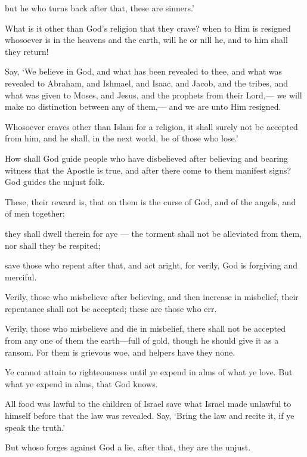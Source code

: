\documentclass[fontsize=14pt, letterpaper, notitlepage, openany, DIV=12]{scrbook} %
\begin{document}
\noindent[3:82]
but he who turns back after that, these are sinners.'

\noindent[3:83]
What is it other than God's religion that they crave? when to Him is resigned whosoever
is in the heavens and the earth, will he or nill he, and to him shall they return!

\noindent[3:84]
Say, `We believe in God, and what has been revealed to thee, and what was revealed to
Abraham, and Ishmael, and Isaac, and Jacob, and the tribes, and what was given to Moses, and
Jesus, and the prophets from their Lord,--- we will make no distinction between any of them,---
and we are unto Him resigned.

\noindent[3:85]
Whosoever craves other than Islam for a religion, it shall surely not be accepted from
him, and he shall, in the next world, be of those who lose.'

\noindent[3:86]
How shall God guide people who have disbelieved after believing and bearing witness
that the Apostle is true, and after there come to them manifest signs? God guides the unjust folk.

\noindent[3:87]
These, their reward is, that on them is the curse of God, and of the angels, and of men
together;

\noindent[3:88]
they shall dwell therein for aye --- the torment shall not be alleviated from them, nor shall
they be respited;

\noindent[3:89]
save those who repent after that, and act aright, for verily, God is forgiving and merciful.

\noindent[3:90]
Verily, those who misbelieve after believing, and then increase in misbelief, their
repentance shall not be accepted; these are those who err.

\noindent[3:91]
Verily, those who misbelieve and die in misbelief, there shall not be accepted from any
one of them the earth---full of gold, though he should give it as a ransom. For them is grievous
woe, and helpers have they none.

\noindent[3:92]
Ye cannot attain to righteousness until ye expend in alms of what ye love. But what ye
expend in alms, that God knows.

\noindent[3:93]
All food was lawful to the children of Israel save what Israel made unlawful to himself
before that the law was revealed. Say, `Bring the law and recite it, if ye speak the truth.'

\noindent[3:94]
But whoso forges against God a lie, after that, they are the unjust.
\end{document}
